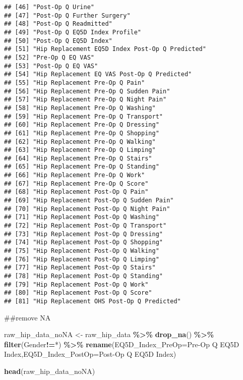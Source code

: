 \documentclass[
]{article}
\newenvironment{Shaded}{\begin{snugshade}}{\end{snugshade}}
\newcommand{\AttributeTok}[1]{\textcolor[rgb]{0.13,0.29,0.53}{#1}}
\newcommand{\FunctionTok}[1]{\textcolor[rgb]{0.13,0.29,0.53}{\textbf{#1}}}
\newcommand{\NormalTok}[1]{#1}
\newcommand{\OtherTok}[1]{\textcolor[rgb]{0.56,0.35,0.01}{#1}}
\newcommand{\SpecialCharTok}[1]{\textcolor[rgb]{0.81,0.36,0.00}{\textbf{#1}}}
\newcommand{\StringTok}[1]{\textcolor[rgb]{0.31,0.60,0.02}{#1}}
\begin{document}
\begin{verbatim}
## [46] "Post-Op Q Urine"                               
## [47] "Post-Op Q Further Surgery"                     
## [48] "Post-Op Q Readmitted"                          
## [49] "Post-Op Q EQ5D Index Profile"                  
## [50] "Post-Op Q EQ5D Index"                          
## [51] "Hip Replacement EQ5D Index Post-Op Q Predicted"
## [52] "Pre-Op Q EQ VAS"                               
## [53] "Post-Op Q EQ VAS"                              
## [54] "Hip Replacement EQ VAS Post-Op Q Predicted"    
## [55] "Hip Replacement Pre-Op Q Pain"                 
## [56] "Hip Replacement Pre-Op Q Sudden Pain"          
## [57] "Hip Replacement Pre-Op Q Night Pain"           
## [58] "Hip Replacement Pre-Op Q Washing"              
## [59] "Hip Replacement Pre-Op Q Transport"            
## [60] "Hip Replacement Pre-Op Q Dressing"             
## [61] "Hip Replacement Pre-Op Q Shopping"             
## [62] "Hip Replacement Pre-Op Q Walking"              
## [63] "Hip Replacement Pre-Op Q Limping"              
## [64] "Hip Replacement Pre-Op Q Stairs"               
## [65] "Hip Replacement Pre-Op Q Standing"             
## [66] "Hip Replacement Pre-Op Q Work"                 
## [67] "Hip Replacement Pre-Op Q Score"                
## [68] "Hip Replacement Post-Op Q Pain"                
## [69] "Hip Replacement Post-Op Q Sudden Pain"         
## [70] "Hip Replacement Post-Op Q Night Pain"          
## [71] "Hip Replacement Post-Op Q Washing"             
## [72] "Hip Replacement Post-Op Q Transport"           
## [73] "Hip Replacement Post-Op Q Dressing"            
## [74] "Hip Replacement Post-Op Q Shopping"            
## [75] "Hip Replacement Post-Op Q Walking"             
## [76] "Hip Replacement Post-Op Q Limping"             
## [77] "Hip Replacement Post-Op Q Stairs"              
## [78] "Hip Replacement Post-Op Q Standing"            
## [79] "Hip Replacement Post-Op Q Work"                
## [80] "Hip Replacement Post-Op Q Score"               
## [81] "Hip Replacement OHS Post-Op Q Predicted"
\end{verbatim}

\#\#remove NA

\begin{Shaded}
\begin{Highlighting}[]
\NormalTok{raw\_hip\_data\_noNA }\OtherTok{\textless{}{-}}\NormalTok{ raw\_hip\_data }\SpecialCharTok{\%\textgreater{}\%} 
  \FunctionTok{drop\_na}\NormalTok{() }\SpecialCharTok{\%\textgreater{}\%} 
  \FunctionTok{filter}\NormalTok{(Gender}\SpecialCharTok{!=}\StringTok{\textquotesingle{}*\textquotesingle{}}\NormalTok{) }\SpecialCharTok{\%\textgreater{}\%} 
  \FunctionTok{rename}\NormalTok{(}\AttributeTok{EQ5D\_Index\_PreOp=}\StringTok{\textquotesingle{}Pre{-}Op Q EQ5D Index\textquotesingle{}}\NormalTok{,}\AttributeTok{EQ5D\_Index\_PostOp=}\StringTok{\textquotesingle{}Post{-}Op Q EQ5D Index\textquotesingle{}}\NormalTok{)}

\FunctionTok{head}\NormalTok{(raw\_hip\_data\_noNA)}
\end{Highlighting}
\end{Shaded}
\end{document}
